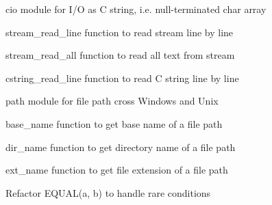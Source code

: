 
\begin{DoxyItemize}
\item {\ttfamily cio} module for I/O as C string, i.\+e. null-\/terminated {\ttfamily char} array
\begin{DoxyItemize}
\item {\ttfamily stream\+\_\+read\+\_\+line} function to read stream line by line
\item {\ttfamily stream\+\_\+read\+\_\+all} function to read all text from stream
\item {\ttfamily cstring\+\_\+read\+\_\+line} function to read C string line by line
\end{DoxyItemize}
\item {\ttfamily path} module for file path cross Windows and Unix
\begin{DoxyItemize}
\item {\ttfamily base\+\_\+name} function to get base name of a file path
\item {\ttfamily dir\+\_\+name} function to get directory name of a file path
\item {\ttfamily ext\+\_\+name} function to get file extension of a file path
\end{DoxyItemize}
\item Refactor {\ttfamily E\+Q\+U\+A\+L(a, b)} to handle rare conditions 
\end{DoxyItemize}